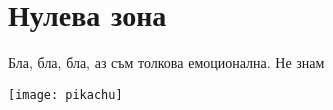\documentclass[main.tex]{subfiles}
\begin{document}
\chapter{Нулева зона}
Бла, бла, бла, аз съм толкова емоционална. 
Не знам

\texttt{[image: pikachu]}
\end{document}
